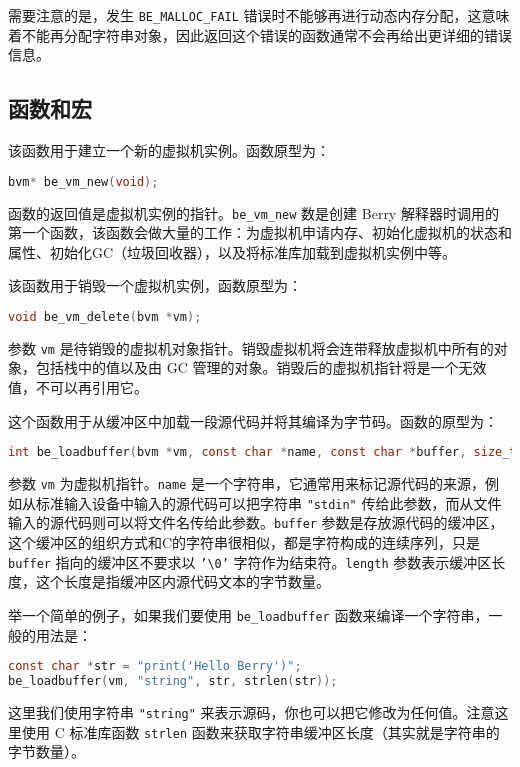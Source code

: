 需要注意的是，发生 \texttt{BE\_MALLOC\_FAIL} 错误时不能够再进行动态内存分配，这意味着不能再分配字符串对象，因此返回这个错误的函数通常不会再给出更详细的错误信息。

\subsection{函数和宏}


该函数用于建立一个新的虚拟机实例。函数原型为：
\begin{lstlisting}[language=c, style=berry, numbers=none]
bvm* be_vm_new(void);
\end{lstlisting}
函数的返回值是虚拟机实例的指针。\texttt{{be\_vm\_new}} 数是创建 Berry 解释器时调用的第一个函数，该函数会做大量的工作：为虚拟机申请内存、初始化虚拟机的状态和属性、初始化GC（垃圾回收器），以及将标准库加载到虚拟机实例中等。


该函数用于销毁一个虚拟机实例，函数原型为：
\begin{lstlisting}[language=c, style=berry, numbers=none]
void be_vm_delete(bvm *vm);
\end{lstlisting}
参数 \texttt{vm} 是待销毁的虚拟机对象指针。销毁虚拟机将会连带释放虚拟机中所有的对象，包括栈中的值以及由 GC 管理的对象。销毁后的虚拟机指针将是一个无效值，不可以再引用它。


这个函数用于从缓冲区中加载一段源代码并将其编译为字节码。函数的原型为：
\begin{lstlisting}[language=c, style=berry, numbers=none]
int be_loadbuffer(bvm *vm, const char *name, const char *buffer, size_t length);
\end{lstlisting}
参数 \texttt{vm} 为虚拟机指针。\texttt{name} 是一个字符串，它通常用来标记源代码的来源，例如从标准输入设备中输入的源代码可以把字符串 \texttt{"stdin"} 传给此参数，而从文件输入的源代码则可以将文件名传给此参数。\texttt{buffer} 参数是存放源代码的缓冲区，这个缓冲区的组织方式和C的字符串很相似，都是字符构成的连续序列，只是 \texttt{buffer} 指向的缓冲区不要求以 \texttt{'\textbackslash 0'} 字符作为结束符。\texttt{length} 参数表示缓冲区长度，这个长度是指缓冲区内源代码文本的字节数量。

举一个简单的例子，如果我们要使用 \texttt{be\_loadbuffer} 函数来编译一个字符串，一般的用法是：
\begin{lstlisting}[language=c, style=berry, numbers=none]
const char *str = "print('Hello Berry')";
be_loadbuffer(vm, "string", str, strlen(str));
\end{lstlisting}
这里我们使用字符串 \texttt{"string"} 来表示源码，你也可以把它修改为任何值。注意这里使用 C 标准库函数 \texttt{strlen} 函数来获取字符串缓冲区长度（其实就是字符串的字节数量）。

